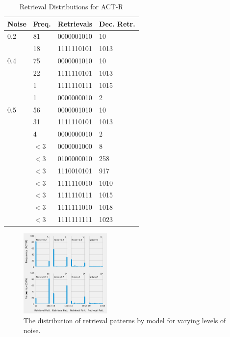 \documentclass[10pt,letterpaper]{article}
\begin{document}
\begin{table}[H]
\begin{center} 
\caption{Retrieval Distributions for ACT-R} 
\label{ibl-endstate-table} 
\vskip 0.12in
\begin{tabular}{llll} 
\hline
Noise  & Freq.  &  Retrievals & Dec. Retr.\\
\hline
0.2 & 81    & 0000001010 & 10 \\
    & 18  &    1111110101 & 1013 \\
\hline

0.4 &    75    & 0000001010 & 10 \\
        & 22  &    1111110101 & 1013 \\
     & 1 & 1111110111 & 1015 \\
     & 1 & 0000000010 & 2\\
\hline
0.5 &    56    & 0000001010 & 10\\
        & 31  &    1111110101 & 1013\\
             & 4 & 0000000010 & 2 \\
        & $<3$ & 0000001000 & 8 \\
        & $<3$ & 0100000010 & 258\\
        & $<3$ & 1110010101 & 917\\
        & $<3$ & 1111110010 & 1010\\
        & $<3$ & 1111110111 & 1015\\
        & $<3$ & 1111111010 & 1018\\
        & $<3$ & 1111111111 & 1023\\
\hline
\end{tabular} 
\end{center} 
\end{table}
%
\begin{figure}[H]
\begin{center}
\includegraphics[width=0.4\textwidth,height=0.3\textwidth]{CAN_Gibbs_2X4.png}
\end{center}
\caption{The distribution of retrieval patterns by model for varying levels of noise.} 
\label{NoiseGibbs-figure}
\end{figure}
\end{document}
